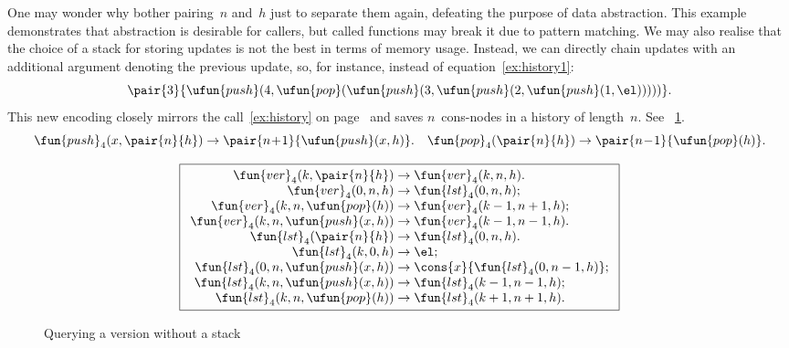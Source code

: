 One may wonder why bother pairing~\(n\) and~\(h\) just to separate
them again, defeating the purpose of data abstraction. This example
demonstrates that abstraction is desirable for callers, but called
functions may break it due to pattern matching. We may also realise
that the choice of a stack for storing updates is not the best in
terms of memory usage. Instead, we can directly chain updates with an
additional argument denoting the previous update, so, for instance,
instead of equation~\eqref{ex:history1}:
\begin{equation*}
\pair{3}{\ufun{push}(4, \ufun{pop}(\ufun{push}(3, \ufun{push}(2, \ufun{push}(1,\el)))))}.
\end{equation*}
This new encoding closely mirrors
the call~\eqref{ex:history} on page~\pageref{ex:history} and saves
\(n\)~cons\hyp{}nodes in a history of length~\(n\). See
\fig~\ref{fig:ver}.
\begin{equation*}
\fun{push}_4(x,\pair{n}{h}) \rightarrow
\pair{n\!+\!1}{\ufun{push}(x,h)}.\quad
\fun{pop}_4(\pair{n}{h}) \rightarrow \pair{n\!-\!1}{\ufun{pop}(h)}.
\end{equation*}
\begin{figure}[t]
\begin{equation*}
\boxed{%
\begin{array}{r@{\;}l@{\;}l}
\fun{ver}_4(k,\pair{n}{h}) & \rightarrow & \fun{ver}_4(k,n,h).\\
\fun{ver}_4(0,n,h) & \rightarrow & \fun{lst}_4(0,n,h);\\
\fun{ver}_4(k,n,\ufun{pop}(h))
                      & \rightarrow & \fun{ver}_4(k-1,n+1,h);\\
\fun{ver}_4(k,n,\ufun{push}(x,h))
                      & \rightarrow & \fun{ver}_4(k-1,n-1,h).\\
\fun{lst}_4(\pair{n}{h}) & \rightarrow & \fun{lst}_4(0,n,h).\\
\fun{lst}_4(k,0,h) & \rightarrow & \el;\\
\fun{lst}_4(0,n,\ufun{push}(x,h)) & \rightarrow
                      & \cons{x}{\fun{lst}_4(0,n-1,h)};\\
\fun{lst}_4(k,n,\ufun{push}(x,h)) & \rightarrow
                      & \fun{lst}_4(k-1,n-1,h);\\
\fun{lst}_4(k,n,\ufun{pop}(h)) & \rightarrow
                      & \fun{lst}_4(k+1,n+1,h).
\end{array}}
\end{equation*}
\caption{Querying a version without a stack}
\label{fig:ver}
\end{figure}

